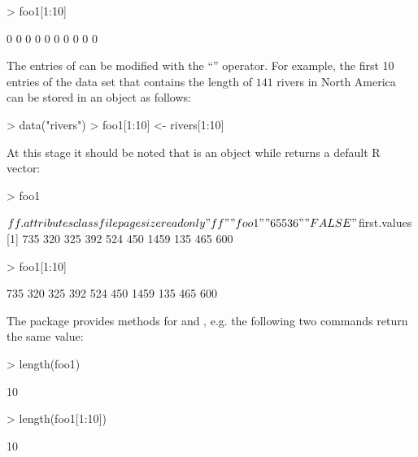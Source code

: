 \documentclass[12pt,a4paper]{article}
\begin{document}
\begin{Schunk}
\begin{Sinput}
> foo1[1:10]
\end{Sinput}
\begin{Soutput}
 [1] 0 0 0 0 0 0 0 0 0 0
\end{Soutput}
\end{Schunk}

The entries of  can be modified with the ``\rc{[\,]<-}'' operator. 
For example, the first 10 entries of the  data set that contains the length of $141$ rivers in North America can be stored in an  object as follows:

\begin{Schunk}
\begin{Sinput}
> data("rivers")
> foo1[1:10] <- rivers[1:10]
\end{Sinput}
\end{Schunk}

At this stage it should be noted that  is an  object while  returns a default R vector:
\begin{Schunk}
\begin{Sinput}
> foo1
\end{Sinput}
\begin{Soutput}
$ff.attributes
   class     file pagesize readonly 
    "ff"   "foo1"  "65536"  "FALSE" 

$first.values
 [1]  735  320  325  392  524  450 1459  135  465  600
\end{Soutput}
\begin{Sinput}
> foo1[1:10]
\end{Sinput}
\begin{Soutput}
 [1]  735  320  325  392  524  450 1459  135  465  600
\end{Soutput}
\end{Schunk}

The package provides methods for  and , e.g. the following two commands return the same value:
\begin{Schunk}
\begin{Sinput}
> length(foo1)
\end{Sinput}
\begin{Soutput}
[1] 10
\end{Soutput}
\begin{Sinput}
> length(foo1[1:10])
\end{Sinput}
\begin{Soutput}
[1] 10
\end{Soutput}
\end{Schunk}
\end{document}

